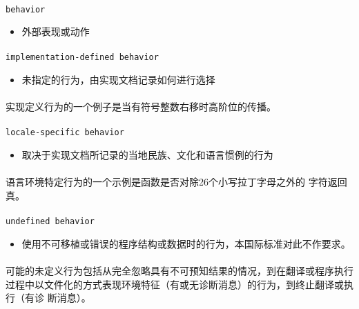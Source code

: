 \paragraph{}
\texttt{behavior}
\begin{itemize}
  \item[]{外部表现或动作}
\end{itemize}

\paragraph{}
\texttt{implementation-defined behavior}
\begin{itemize}
  \item[]{未指定的行为，由实现文档记录如何进行选择}
\end{itemize}

\paragraph{}
\ex* 实现定义行为的一个例子是当有符号整数右移时高阶位的传播。

\paragraph{}
\texttt{locale-specific behavior}
\begin{itemize}
  \item[]{取决于实现文档所记录的当地民族、文化和语言惯例的行为}
\end{itemize}

\paragraph{}
\ex* 语言环境特定行为的一个示例是函数是否对除26个小写拉丁字母之外的
字符返回真。

\paragraph{}
\texttt{undefined behavior}
\begin{itemize}
  \item[]{使用不可移植或错误的程序结构或数据时的行为，本国际标准对此不作要求。}
\end{itemize}

\paragraph{}
\notes* 可能的未定义行为包括从完全忽略具有不可预知结果的情况，到在翻译或程序执行
过程中以文件化的方式表现环境特征（有或无诊断消息）的行为，到终止翻译或执行（有诊
断消息）。

